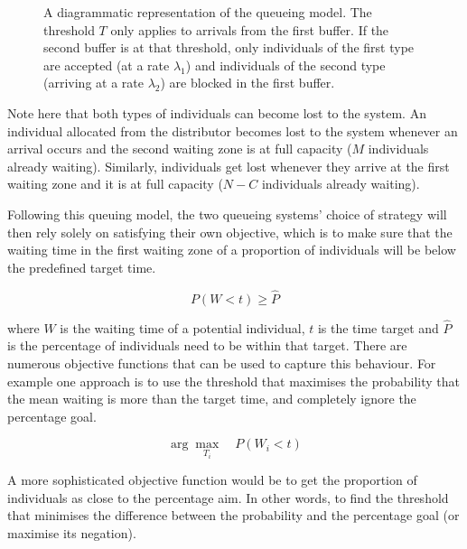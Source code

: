 \begin{figure}[h]
    \caption{A diagrammatic representation of the queueing model. 
    The threshold \(T\) only applies to arrivals from the first buffer. 
    If the second buffer is at that threshold, only individuals of the first type 
    are accepted (at a rate \(\lambda_1\)) and individuals of the second type 
    (arriving at a rate \(\lambda_2\)) are blocked in the first buffer.}
    \label{fig:diagram_of_queueing_system}
\end{figure}

Note here that both types of individuals can become lost to the system. 
An individual allocated from the distributor becomes lost to the system whenever 
an arrival occurs and the second waiting zone is at full capacity (\(M\) 
individuals already waiting).
Similarly, individuals get lost whenever they arrive at the first waiting 
zone and it is at full capacity (\(N - C\) individuals already waiting).

Following this queuing model, the two queueing systems' choice of strategy will 
then rely solely on satisfying their own 
objective, which is to make sure that the waiting time in the first waiting zone 
of a proportion of individuals will be below the predefined target time.

\begin{equation}
    P(W < t) \geq \hat{P}
\end{equation}

where \(W\) is the waiting time of a potential individual, \(t\) is the time 
target and \(\hat{P}\) is the percentage of individuals need to be within that 
target. 
There are numerous objective functions that can be used to capture this 
behaviour. 
For example one approach is to use the threshold that maximises the probability 
that 
the mean waiting is more than the target time, and completely ignore the 
percentage goal.

\begin{equation}
    \arg \max_{T_i} \quad P(W_i < t)
\end{equation}

A more sophisticated objective function would be to get the proportion 
of individuals as close to the percentage aim. 
In other words, to find the threshold that minimises the difference between the 
probability and the percentage goal (or maximise its negation).

